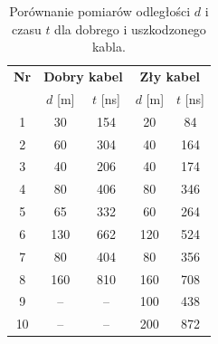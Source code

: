 \documentclass[12pt]{article}
\begin{document}
\begin{table}[H]
	\centering
	\begin{tabular}{c|cc|cc}
		\toprule
		\textbf{Nr} & \multicolumn{2}{c|}{\textbf{Dobry kabel}} & \multicolumn{2}{c}{\textbf{Zły kabel}}                      \\
		            & $d$ [m]                                   & $t$ [ns]                               & $d$ [m] & $t$ [ns] \\
		\midrule
		1           & 30                                        & 154                                    & 20      & 84       \\
		2           & 60                                        & 304                                    & 40      & 164      \\
		3           & 40                                        & 206                                    & 40      & 174      \\
		4           & 80                                        & 406                                    & 80      & 346      \\
		5           & 65                                        & 332                                    & 60      & 264      \\
		6           & 130                                       & 662                                    & 120     & 524      \\
		7           & 80                                        & 404                                    & 80      & 356      \\
		8           & 160                                       & 810                                    & 160     & 708      \\
		9           & --                                        & --                                     & 100     & 438      \\
		10          & --                                        & --                                     & 200     & 872      \\
		\bottomrule
	\end{tabular}
	\caption{Porównanie pomiarów odległości $d$ i czasu $t$ dla dobrego i uszkodzonego kabla.}
	\label{tab:good_vs_bad_cable}
\end{table}
\end{document}
